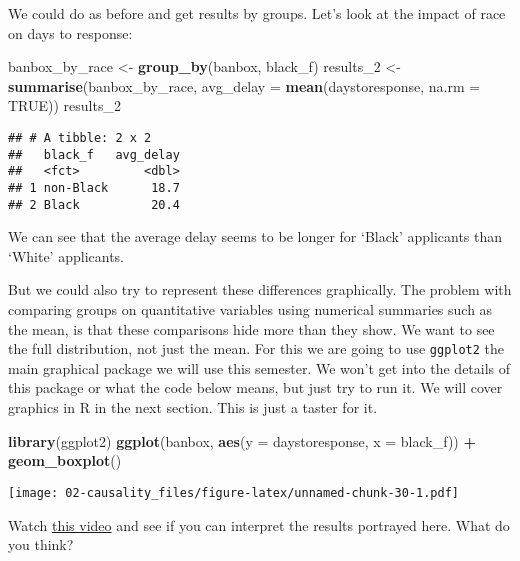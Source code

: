 \documentclass[
]{book}
\newenvironment{Shaded}{\begin{snugshade}}{\end{snugshade}}
\newcommand{\AttributeTok}[1]{\textcolor[rgb]{0.13,0.29,0.53}{#1}}
\newcommand{\ConstantTok}[1]{\textcolor[rgb]{0.56,0.35,0.01}{#1}}
\newcommand{\FunctionTok}[1]{\textcolor[rgb]{0.13,0.29,0.53}{\textbf{#1}}}
\newcommand{\NormalTok}[1]{#1}
\newcommand{\OtherTok}[1]{\textcolor[rgb]{0.56,0.35,0.01}{#1}}
\newcommand{\SpecialCharTok}[1]{\textcolor[rgb]{0.81,0.36,0.00}{\textbf{#1}}}
\begin{document}
We could do as before and get results by groups. Let's look at the impact of race on days to response:

\begin{Shaded}
\begin{Highlighting}[]
\NormalTok{banbox\_by\_race }\OtherTok{\textless{}{-}} \FunctionTok{group\_by}\NormalTok{(banbox, black\_f)}
\NormalTok{results\_2 }\OtherTok{\textless{}{-}} \FunctionTok{summarise}\NormalTok{(banbox\_by\_race,}
  \AttributeTok{avg\_delay =} \FunctionTok{mean}\NormalTok{(daystoresponse, }\AttributeTok{na.rm =} \ConstantTok{TRUE}\NormalTok{))}
\NormalTok{results\_2}
\end{Highlighting}
\end{Shaded}

\begin{verbatim}
## # A tibble: 2 x 2
##   black_f   avg_delay
##   <fct>         <dbl>
## 1 non-Black      18.7
## 2 Black          20.4
\end{verbatim}

We can see that the average delay seems to be longer for `Black' applicants than `White' applicants.

But we could also try to represent these differences graphically. The problem with comparing groups on quantitative variables using numerical summaries such as the mean, is that these comparisons hide more than they show. We want to see the full distribution, not just the mean. For this we are going to use \texttt{ggplot2} the main graphical package we will use this semester. We won't get into the details of this package or what the code below means, but just try to run it. We will cover graphics in R in the next section. This is just a taster for it.

\begin{Shaded}
\begin{Highlighting}[]
\FunctionTok{library}\NormalTok{(ggplot2)}
\FunctionTok{ggplot}\NormalTok{(banbox, }\FunctionTok{aes}\NormalTok{(}\AttributeTok{y =}\NormalTok{ daystoresponse, }\AttributeTok{x =}\NormalTok{ black\_f)) }\SpecialCharTok{+} 
  \FunctionTok{geom\_boxplot}\NormalTok{() }
\end{Highlighting}
\end{Shaded}

\texttt{[image: 02-causality\_files/figure-latex/unnamed-chunk-30-1.pdf]}

Watch \href{https://www.khanacademy.org/math/probability/data-distributions-a1/box--whisker-plots-a1/v/reading-box-and-whisker-plots}{this video} and see if you can interpret the results portrayed here. What do you think?
\end{document}
